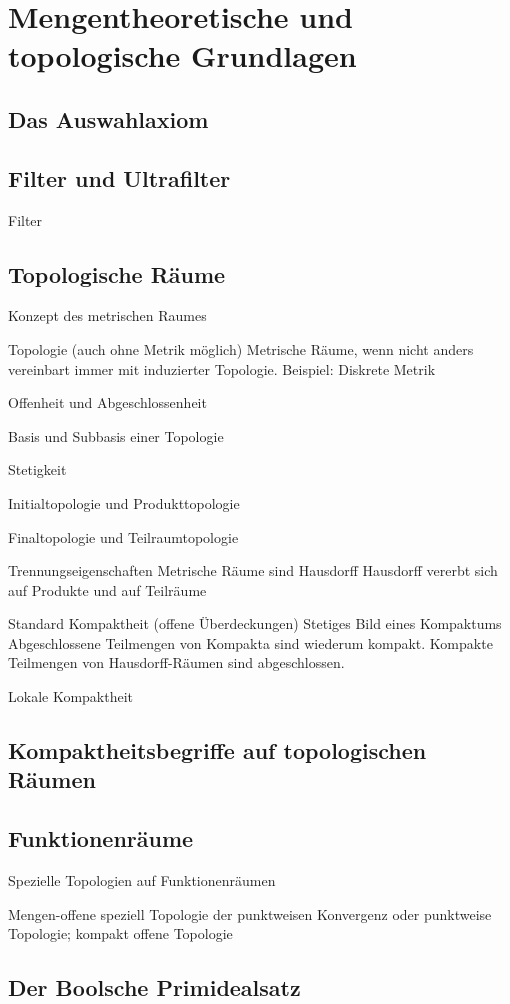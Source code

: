 \section{Mengentheoretische und topologische Grundlagen}

\subsection{Das Auswahlaxiom}

\subsection{Filter und Ultrafilter}

\begin{defn}
  Filter
\end{defn}

\subsection{Topologische Räume}

Konzept des metrischen Raumes

Topologie (auch ohne Metrik möglich)
Metrische Räume, wenn nicht anders vereinbart immer mit induzierter Topologie. 
Beispiel: Diskrete Metrik

Offenheit und Abgeschlossenheit

Basis und Subbasis einer Topologie

Stetigkeit

Initialtopologie und Produkttopologie

Finaltopologie und Teilraumtopologie

Trennungseigenschaften
Metrische Räume sind Hausdorff
Hausdorff vererbt sich auf Produkte und auf Teilräume

Standard Kompaktheit (offene Überdeckungen)
Stetiges Bild eines Kompaktums
Abgeschlossene Teilmengen von Kompakta sind wiederum kompakt.
Kompakte Teilmengen von Hausdorff-Räumen sind abgeschlossen.

Lokale Kompaktheit

\subsection{Kompaktheitsbegriffe auf topologischen Räumen}

\subsection{Funktionenräume}

Spezielle Topologien auf Funktionenräumen

Mengen-offene speziell Topologie der punktweisen Konvergenz oder punktweise Topologie; kompakt offene Topologie

\subsection{Der Boolsche Primidealsatz}
